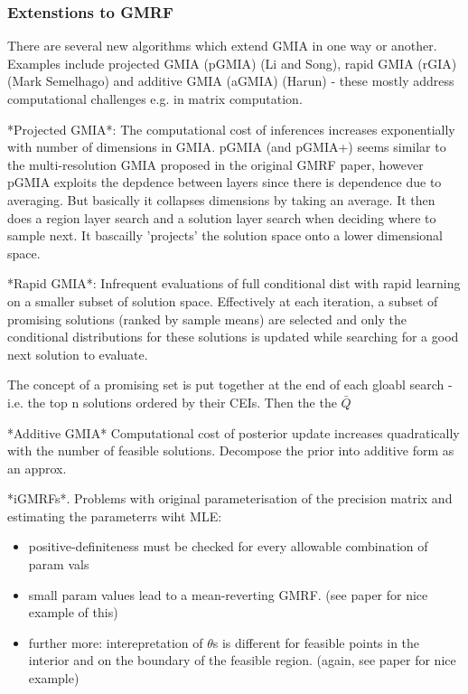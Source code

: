 \message{ !name(SO-Methods.tex)}\documentclass{article}
\begin{document}
\subsubsection{Extenstions to GMRF}

There are several new algorithms which extend GMIA in one way or another. Examples include projected GMIA (pGMIA) (Li and Song), rapid GMIA (rGIA) (Mark Semelhago) and additive GMIA (aGMIA) (Harun) - these mostly address computational challenges e.g. in matrix computation. \newline

*Projected GMIA*: The computational cost of inferences increases exponentially with number of dimensions in GMIA. pGMIA (and pGMIA+) seems similar to the multi-resolution GMIA proposed in the original GMRF paper, however pGMIA exploits the depdence between layers since there is dependence due to averaging. But basically it collapses dimensions by taking an average. It then does a region layer search and a solution layer search when deciding where to sample next. It bascailly 'projects' the solution space onto a lower dimensional space. \newline

*Rapid GMIA*: Infrequent evaluations of full conditional dist with rapid learning on a smaller subset of solution space. Effectively at each iteration, a subset of promising solutions (ranked by sample means) are selected and only the conditional distributions for these solutions is updated while searching for a good next solution to evaluate. \newline

The concept of a promising set is put together at the end of each gloabl search - i.e. the top n solutions ordered by their CEIs. Then the the $\bar{Q}$ 

*Additive GMIA* Computational cost of posterior update increases quadratically with the number of feasible solutions. Decompose the prior into additive form as an approx. 

*iGMRFs*. Problems with original parameterisation of the precision matrix and estimating the parameterrs wiht MLE:

\begin{itemize}
\item positive-definiteness must be checked for every allowable combination of param vals
\item small param values lead to a mean-reverting GMRF. (see paper for nice example of this)
  \item further more: interepretation of $\theta$s is different for feasible points in the interior and on the boundary of the feasible region. (again, see paper for nice example)
\end{itemize}
\end{document}
